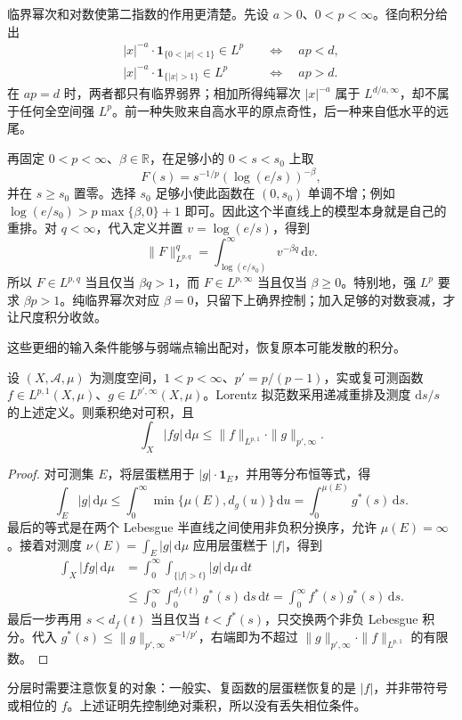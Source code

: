 \ProseParagraphBreak

临界幂次和对数使第二指数的作用更清楚。先设 \(a>0\)、\(0<p<\infty\)。径向积分给出
\[
 \begin{aligned}
 |x|^{-a}\cdot\mathbf1_{\{0<|x|<1\}}\in L^p
 &\quad\Longleftrightarrow\quad ap<d,\\
 |x|^{-a}\cdot\mathbf1_{\{|x|>1\}}\in L^p
 &\quad\Longleftrightarrow\quad ap>d.
 \end{aligned}
\]
在 \(ap=d\) 时，两者都只有临界弱界；相加所得纯幂次 \(|x|^{-a}\) 属于 \(L^{d/a,\infty}\)，却不属于任何全空间强 \(L^p\)。前一种失败来自高水平的原点奇性，后一种来自低水平的远尾。

\ProseParagraphBreak

再固定 \(0<p<\infty\)、\(\beta\in\mathbb R\)，在足够小的 \(0<s<s_0\) 上取
\[F(s)=s^{-1/p}(\log(e/s))^{-\beta},\]
并在 \(s\geq s_0\) 置零。选择 \(s_0\) 足够小使此函数在 \((0,s_0)\) 单调不增；例如 \(\log(e/s_0)>p\max\{\beta,0\}+1\) 即可。因此这个半直线上的模型本身就是自己的重排。对 \(q<\infty\)，代入定义并置 \(v=\log(e/s)\)，得到
\[\|F\|_{L^{p,q}}^q=\int_{\log(e/s_0)}^\infty v^{-\beta q}\,\mathrm dv.\]
所以 \(F\in L^{p,q}\) 当且仅当 \(\beta q>1\)，而 \(F\in L^{p,\infty}\) 当且仅当 \(\beta\geq0\)。特别地，强 \(L^p\) 要求 \(\beta p>1\)。纯临界幂次对应 \(\beta=0\)，只留下上确界控制；加入足够的对数衰减，才让尺度积分收敛。

\ProseParagraphBreak

这些更细的输入条件能够与弱端点输出配对，恢复原本可能发散的积分。
\begin{proposition}\label{b2:prop:17-lorentz-pairing}
设 \((X,\mathcal A,\mu)\) 为测度空间，\(1<p<\infty\)、\(p'=p/(p-1)\)，实或复可测函数 \(f\in L^{p,1}(X,\mu)\)、\(g\in L^{p',\infty}(X,\mu)\)。Lorentz 拟范数采用递减重排及测度 \(\mathrm ds/s\) 的上述定义。则乘积绝对可积，且
\[\int_X|fg|\,\mathrm d\mu
 \leq\|f\|_{L^{p,1}}\cdot\|g\|_{p',\infty}.\]
\end{proposition}
\begin{proof}
对可测集 \(E\)，将层蛋糕用于 \(|g|\cdot\mathbf1_E\)，并用等分布恒等式，得
\[
 \int_E|g|\,\mathrm d\mu
 \leq\int_0^\infty\min\{\mu(E),d_g(u)\}\,\mathrm du
 =\int_0^{\mu(E)}g^*(s)\,\mathrm ds.
\]
最后的等式是在两个 Lebesgue 半直线之间使用非负积分换序，允许 \(\mu(E)=\infty\)。接着对测度 \(\nu(E)=\int_E|g|\,\mathrm d\mu\) 应用层蛋糕于 \(|f|\)，得到
\[
 \begin{aligned}
 \int_X|fg|\,\mathrm d\mu
 &=\int_0^\infty\int_{\{|f|>t\}}|g|\,\mathrm d\mu\,\mathrm dt\\
 &\leq\int_0^\infty\int_0^{d_f(t)}g^*(s)\,\mathrm ds\,\mathrm dt
 =\int_0^\infty f^*(s)g^*(s)\,\mathrm ds.
 \end{aligned}
\]
最后一步再用 \(s<d_f(t)\) 当且仅当 \(t<f^*(s)\)，只交换两个非负 Lebesgue 积分。代入 \(g^*(s)\leq\|g\|_{p',\infty}s^{-1/p'}\)，右端即为不超过 \(\|g\|_{p',\infty}\cdot\|f\|_{L^{p,1}}\) 的有限数。
\end{proof}
分层时需要注意恢复的对象：一般实、复函数的层蛋糕恢复的是 \(|f|\)，并非带符号或相位的 \(f\)。上述证明先控制绝对乘积，所以没有丢失相位条件。

